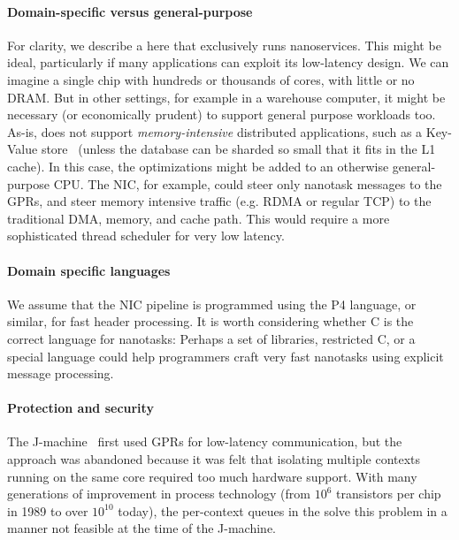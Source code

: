 
\paragraph{Domain-specific versus general-purpose} For clarity, we describe a \name{} here that exclusively runs nanoservices. This might be ideal, particularly if many applications can exploit its low-latency design. We can imagine a single chip with hundreds or thousands of \name{} cores, with little or no DRAM. But in other settings, for example in a warehouse computer, it might be necessary (or economically prudent) to support general purpose workloads too. As-is, \name{} does not support \emph{memory-intensive} distributed applications, such as a Key-Value store~\cite{memcached} (unless the database can be sharded so small that it fits in the L1 cache). In this case, the \name{} optimizations might be added to an otherwise general-purpose CPU. The NIC, for example, could steer only nanotask messages to the GPRs, and steer memory intensive traffic (e.g. RDMA or regular TCP) to the traditional DMA, memory, and cache path. This would require a more sophisticated thread scheduler for very low latency.

\paragraph{Domain specific languages} We assume that the NIC pipeline is programmed using the P4 language, or similar, for fast header processing. It is worth considering whether C is the correct language for nanotasks: Perhaps a set of libraries, restricted C, or a special language could help programmers craft very fast nanotasks using explicit message processing.

\paragraph{Protection and security} The J-machine~\cite{jmachine} first used GPRs for low-latency communication, but the approach was abandoned because it was felt that isolating multiple contexts running on the same core required too much hardware support. With many generations of improvement in process technology (from $10^6$ transistors per chip in 1989 to over $10^{10}$ today), the per-context queues in the \name{} solve this problem in a manner not feasible at the time of the J-machine. 

